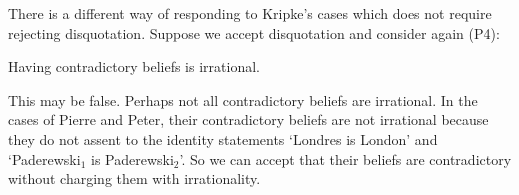 \begin{objection}
There is a different way of responding to Kripke's cases which does not require rejecting disquotation. Suppose we accept disquotation and consider again (P4):
\begin{premises}
  \item[(P4)] Having contradictory beliefs is irrational.
\end{premises}
This may be false. Perhaps not all contradictory beliefs are irrational. In the cases of Pierre and Peter, their contradictory beliefs are not irrational because they do not assent to the identity statements `Londres is London' and `Paderewski$_1$ is Paderewski$_2$'. So we can accept that their beliefs are contradictory without charging them with irrationality.
\end{objection}
